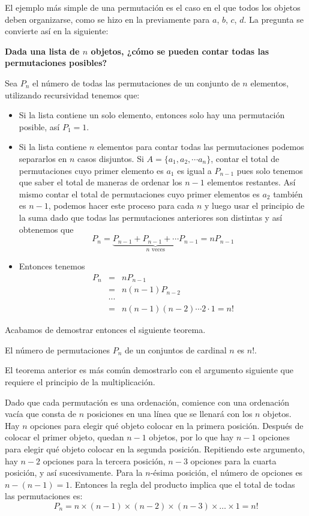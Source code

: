 El ejemplo más simple de una permutación es el caso en el que todos los objetos deben organizarse, como se hizo en la previamente para $a$, $b$, $c$, $d$. La pregunta se convierte así en la siguiente:
\begin{center}
    \textbf{Dada una lista de $n$ objetos, ¿cómo se pueden contar todas las permutaciones posibles?}
\end{center}
Sea $P_n$ el número de todas las permutaciones de un conjunto de $n$ elementos, utilizando recursividad tenemos que:
\begin{itemize}
    \item Si la lista contiene un solo elemento, entonces solo hay una permutación posible, así $P_1=1$.
    \item Si la lista contiene $n$ elementos para contar todas las permutaciones podemos separarlos en $n$ casos disjuntos. Si $A=\{a_1, a_2, \cdots a_n\}$, contar el total de permutaciones cuyo primer elemento es $a_1$ es igual a $P_{n-1}$ pues solo tenemos que saber el total de maneras de ordenar los $n-1$ elementos restantes. Así mismo contar el total de permutaciones cuyo primer elementos es $a_2$ también es $n-1$, podemos hacer este proceso para cada $n$ y luego usar el principio de la suma dado que todas las permutaciones anteriores son distintas y así obtenemos que $$P_n=\underbrace{P_{n-1}+P_{n-1}+\cdots P_{n-1}}_{\text{$n$ veces}}=nP_{n-1}$$
    
    \item Entonces tenemos 
    \begin{eqnarray*}
        P_{n} & = & n P_{n-1}\\
        & = & n(n-1)P_{n-2}\\
        & \cdots &\\
        & = & n(n-1)(n-2)\cdots 2\cdot 1 =n!
    \end{eqnarray*}
\end{itemize}

Acabamos de demostrar entonces el siguiente teorema.

\begin{teorema}
    El número de permutaciones $P_n$ de un conjuntos de cardinal $n$ es $n!$.
\end{teorema}

El teorema anterior es más común demostrarlo con el argumento siguiente que requiere el principio de la multiplicación.

Dado que cada permutación es una ordenación, comience con una ordenación vacía que consta de $n$ posiciones en una línea que se llenará con los $n$ objetos. Hay $n$ opciones para elegir qué objeto colocar en la primera posición. Después de colocar el primer objeto, quedan $n-1$ objetos, por lo que hay $n-1$ opciones para elegir qué objeto colocar en la segunda posición. Repitiendo este argumento, hay $n-2$ opciones para la tercera posición, $n-3$ opciones para la cuarta posición, y así sucesivamente. Para la $n$-ésima posición, el número de opciones es $n-(n-1)= 1$. Entonces la regla del producto implica que el total de todas las permutaciones es:
\[ P_n= n\times (n-1)\times (n-2)\times(n-3)\times \ldots \times 1=n!\]

